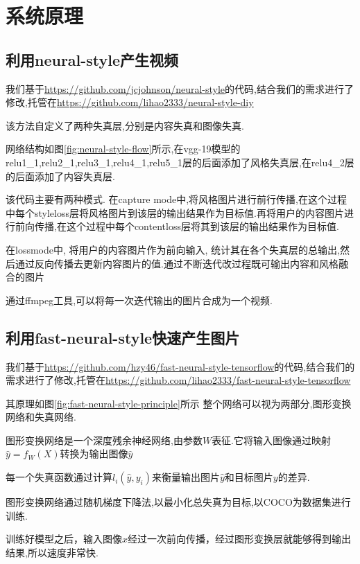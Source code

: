 \section{系统原理}
\subsection{利用neural-style产生视频}
我们基于\url{https://github.com/jcjohnson/neural-style}的代码,结合我们的需求进行了修改,托管在\url{https://github.com/lihao2333/neural-style-diy}

该方法自定义了两种失真层,分别是内容失真和图像失真.

网络结构如图\ref{fig:neural-style-flow}所示,在vgg-19模型的relu1\_1,relu2\_1,relu3\_1,relu4\_1,relu5\_1层的后面添加了风格失真层,在relu4\_2层的后面添加了内容失真层.

该代码主要有两种模式. 在capture mode中,将风格图片进行前行传播,在这个过程中每个styleloss层将风格图片到该层的输出结果作为目标值.再将用户的内容图片进行前向传播,在这个过程中每个contentloss层将其到该层的输出结果作为目标值.

在lossmode中, 将用户的内容图片作为前向输入, 统计其在各个失真层的总输出,然后通过反向传播去更新内容图片的值.通过不断迭代改过程既可输出内容和风格融合的图片

通过ffmpeg工具,可以将每一次迭代输出的图片合成为一个视频.
\subsection{利用fast-neural-style快速产生图片}
我们基于\url{https://github.com/hzy46/fast-neural-style-tensorflow}的代码,结合我们的需求进行了修改,托管在\url{https://github.com/lihao2333/fast-neural-style-tensorflow}

其原理如图\ref{fig:fast-neural-style-principle}所示
整个网络可以视为两部分,图形变换网络和失真网络.

图形变换网络是一个深度残余神经网络,由参数$W$表征.它将输入图像通过映射$\hat y=f_W(X)$转换为输出图像$\hat y$

每一个失真函数通过计算$l_i(\hat y,y_i)$来衡量输出图片$\hat y$和目标图片$y$的差异.

图形变换网络通过随机梯度下降法,以最小化总失真为目标,以COCO为数据集进行训练.

训练好模型之后，输入图像$x$经过一次前向传播，经过图形变换层就能够得到输出结果,所以速度非常快.

